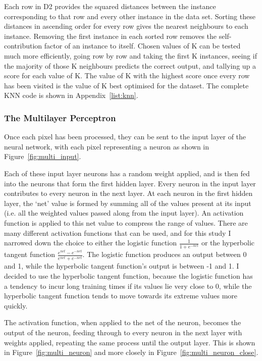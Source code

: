 Each row in D2 provides the squared distances between the instance corresponding to that row and every other instance in the data set. Sorting these distances in ascending order for every row gives the nearest neighbours to each instance. Removing the first instance in each sorted row removes the self-contribution factor of an instance to itself. Chosen values of K can be tested much more efficiently, going row by row and taking the first K instances, seeing if the majority of those K neighbours predicts the correct output, and tallying up a score for each value of K. The value of K with the highest score once every row has been visited is the value of K best optimised for the dataset. The complete KNN code is shown in Appendix~\ref{list:knn}.

\subsubsection{The Multilayer Perceptron}

Once each pixel has been processed, they can be sent to the input layer of the neural network, with each pixel representing a neuron as shown in Figure~\ref{fig:multi_input}.
 
Each of these input layer neurons has a random weight applied, and is then fed into the neurons that form the first hidden layer. Every neuron in the input layer contributes to every neuron in the next layer. At each neuron in the first hidden layer, the `net' value is formed by summing all of the values present at its input (i.e. all the weighted values passed along from the input layer). An activation function is applied to this net value to compress the range of values. There are many different activation functions that can be used, and for this study I narrowed down the choice to either the logistic function $ \frac{1}{1 + e^{-net}} $ or the hyperbolic tangent function $\frac{e^{net} - e^{-net}}{e^{net} + e^{-net}} $. The logistic function produces an output between 0 and 1, while the hyperbolic tangent function's output is between -1 and 1. I decided to use the hyperbolic tangent function, because the logistic function has a tendency to incur long training times if its values lie very close to 0, while the hyperbolic tangent function tends to move towards its extreme values more quickly.  

The activation function, when applied to the net of the neuron, becomes the output of the neuron, feeding through to every neuron in the next layer with weights applied, repeating the same process until the output layer. This is shown in Figure~\ref{fig:multi_neuron} and more closely in Figure~\ref{fig:multi_neuron_close}. 
 
